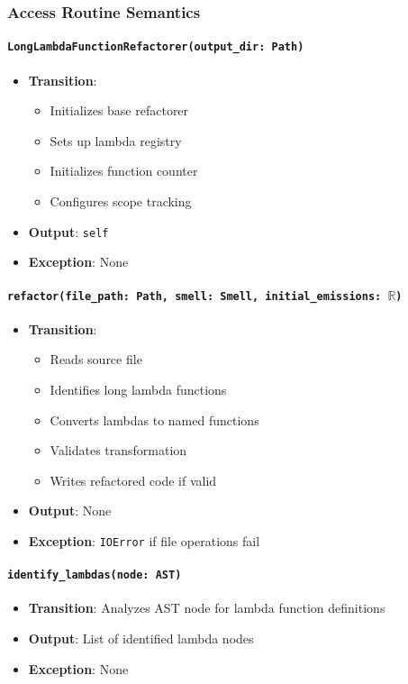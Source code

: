 \documentclass[12pt, titlepage]{article}
\begin{document}
\subsubsection{Access Routine Semantics}

\paragraph{\texttt{LongLambdaFunctionRefactorer(output\_dir: Path)}}
\begin{itemize}
  \item \textbf{Transition}: 
    \begin{itemize}
      \item Initializes base refactorer
      \item Sets up lambda registry
      \item Initializes function counter
      \item Configures scope tracking
    \end{itemize}
  \item \textbf{Output}: \texttt{self}
  \item \textbf{Exception}: None
\end{itemize}

\paragraph{\texttt{refactor(file\_path: Path, smell: Smell, initial\_emissions: $\mathbb{R}$)}}
\begin{itemize}
  \item \textbf{Transition}:
    \begin{itemize}
      \item Reads source file
      \item Identifies long lambda functions
      \item Converts lambdas to named functions
      \item Validates transformation
      \item Writes refactored code if valid
    \end{itemize}
  \item \textbf{Output}: None
  \item \textbf{Exception}: \texttt{IOError} if file operations fail
\end{itemize}

\paragraph{\texttt{identify\_lambdas(node: AST)}}
\begin{itemize}
  \item \textbf{Transition}: Analyzes AST node for lambda function definitions
  \item \textbf{Output}: List of identified lambda nodes
  \item \textbf{Exception}: None
\end{itemize}
\end{document}
